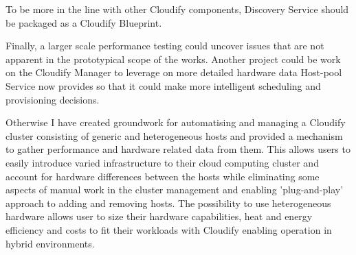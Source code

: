 To be more in the line with other Cloudify components, Discovery Service should be packaged as a Cloudify Blueprint. 

Finally, a larger scale performance testing could uncover issues that are not apparent in the prototypical scope of the works. Another project could be work on the Cloudify Manager to leverage on more detailed hardware data Host-pool Service now provides so that it could make more intelligent scheduling and provisioning decisions. 

Otherwise I have created groundwork for automatising and managing a Cloudify cluster consisting of generic and heterogeneous hosts and provided a mechanism to gather performance and hardware related data from them. This allows users to easily introduce varied infrastructure to their cloud computing cluster and account for hardware differences between the hosts while eliminating some aspects of manual work in the cluster management and enabling 'plug-and-play' approach to adding and removing hosts. The possibility to use heterogeneous hardware allows user to size their hardware capabilities, heat and energy efficiency and costs to fit their workloads with Cloudify enabling operation in hybrid environments.

\clearpage
\newpage